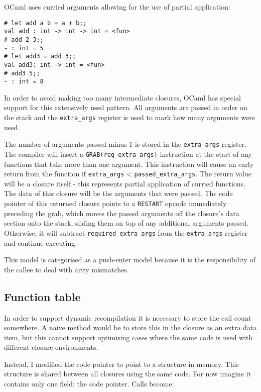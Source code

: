 OCaml uses curried arguments allowing for the use of partial application:

\begin{verbatim}
# let add a b = a + b;;
val add : int -> int -> int = <fun>
# add 2 3;;
- : int = 5
# let add3 = add 3;;
val add3: int -> int = <fun>
# add3 5;;
- : int = 8
\end{verbatim}

In order to avoid making too many intermediate closures, OCaml has special support for this
extensively used pattern. All arguments are passed in order on the stack and the
\texttt{extra\_args}
register is used to mark how many arguments were used.

The number of arguments passed minus 1 is stored in the \texttt{extra\_args} register. The compiler
will insert a \texttt{GRAB(req\_extra\_args)} instruction at the start of any functions that take
more than one argument.  This instruction will cause an early return from the function if
\texttt{extra\_args} <
\texttt{passed\_extra\_args}. The return value will be a closure itself - this represents partial
application of curried functions. The data of this closure will be the arguments that were passed.
The code pointer of this returned closure points to a \texttt{RESTART} opcode immediately
preceding the grab, which moves the passed arguments off  the closure's data section onto the
stack, sliding them on top of any additional arguments passed.	Otherwise, it will subtract
\texttt{required\_extra\_args} from the \texttt{extra\_args} register
and continue executing.

This model is categorised as a push-enter model because it is the responsibility of the callee to
deal with arity mismatches.

\subsection{Function table}

In order to support dynamic recompilation it is necessary to store the call count somewhere. A
naive method would be to store this in the closure as an extra data item, but this cannot support
optimising cases where the same code is used with different closure environments.

Instead, I modified the code pointer to point to a structure in memory. This structure is shared
between all closures using the same code. For now imagine it contains only one field: the code
pointer. Calls become:

